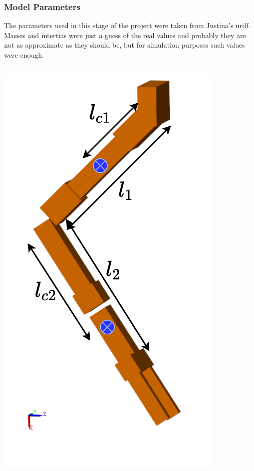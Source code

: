 \documentclass[9pt,spanish,aspectratio=1610]{beamer}
\begin{document}
\begin{frame}\frametitle{Model Parameters}
  The parameters used in this stage of the project were taken from Justina's urdf. Masses and intertias were just a guess of the real values and probably they are not as approximate as they should be, but for simulation purposes such values were enough.
  \begin{columns}
    \begin{column}{0.25\textwidth}
      \includegraphics[width=\textwidth]{Figures/parameters.pdf}

\end{column}
\end{columns}
\end{frame}
\end{document}
